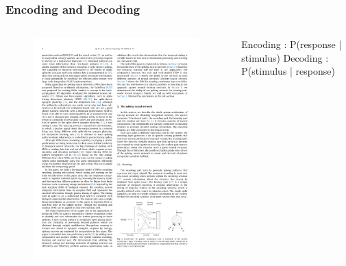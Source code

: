 \documentclass[10pt,aspectratio=43,mathserif, notes]{beamer}
\begin{document}
		\begin{frame}
		  \frametitle{\textbf{Encoding and Decoding}}
            \begin{columns}
            \begin{column}{0.5\textwidth}
            \begin{figure}[h]
            \centering
            \includegraphics[width=1\linewidth]{image/Coding_2.pdf}
            \end{figure}
            \end{column}
            \begin{column}{0.5\textwidth}
            Encoding : P(response | stimulus)
            Decoding : P(stimulus | response)



\end{column}
\end{columns}
\end{frame}
\end{document}
